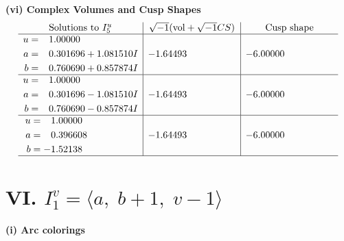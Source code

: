 \documentclass[1p]{elsarticle_modified}
\theoremstyle{definition}
\newcommand{\I}{\sqrt{-1}}
\begin{document}
\newpage\flushleft \textbf{(vi) Complex Volumes and Cusp Shapes}
$$\begin{array}{c|c|c}  
\text{Solutions to }I^u_{5}& \I (\text{vol} + \sqrt{-1}CS) & \text{Cusp shape}\\
 \hline 
\begin{aligned}
u &= \phantom{-}1.00000\phantom{ +0.000000I} \\
a &= \phantom{-}0.301696 + 1.081510 I \\
b &= \phantom{-}0.760690 + 0.857874 I\end{aligned}
 & -1.64493\phantom{ +0.000000I} & -6.00000\phantom{ +0.000000I} \\ \hline\begin{aligned}
u &= \phantom{-}1.00000\phantom{ +0.000000I} \\
a &= \phantom{-}0.301696 - 1.081510 I \\
b &= \phantom{-}0.760690 - 0.857874 I\end{aligned}
 & -1.64493\phantom{ +0.000000I} & -6.00000\phantom{ +0.000000I} \\ \hline\begin{aligned}
u &= \phantom{-}1.00000\phantom{ +0.000000I} \\
a &= \phantom{-}0.396608\phantom{ +0.000000I} \\
b &= -1.52138\phantom{ +0.000000I}\end{aligned}
 & -1.64493\phantom{ +0.000000I} & -6.00000\phantom{ +0.000000I}\\
 \hline 
 \end{array}$$\newpage\newpage\renewcommand{\arraystretch}{1}
\centering \section*{VI. $I^v_{1}= \langle a,\;b+1,\;v-1 \rangle$}
\flushleft \textbf{(i) Arc colorings}\\
\end{document}
